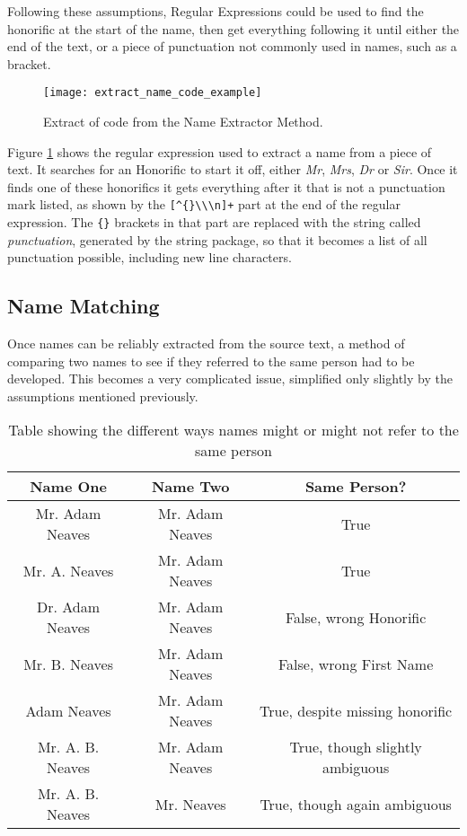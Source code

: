 Following these assumptions, Regular Expressions could be used to find the honorific at the start of the name, then get everything following it until either the end of the text, or a piece of punctuation not commonly used in names, such as a bracket.
\begin{figure}[ht]
\texttt{[image: extract\_name\_code\_example]}
\caption{Extract of code from the Name Extractor Method.}
\label{fig:name_extract_code}
\end{figure}

Figure \ref{fig:name_extract_code} shows the regular expression used to extract a name from a piece of text. It searches for an Honorific to start it off, either \emph{Mr}, \emph{Mrs}, \emph{Dr} or \emph{Sir}. Once it finds one of these honorifics it gets everything after it that is not a punctuation mark listed, as shown by the \verb|[^{}\\\n]+| part at the end of the regular expression. The \verb|{}| brackets in that part are replaced with the string called \emph{punctuation}, generated by the string package, so that it becomes a list of all punctuation possible, including new line characters.  

\subsection{Name Matching}
\label{sec:imp_name_match}
Once names can be reliably extracted from the source text, a method of comparing two names to see if they referred to the same person had to be developed. This becomes a very complicated issue, simplified only slightly by the assumptions mentioned previously.

\begin{table}[ht!]
\centering
\begin{tabular}{|c c c|}
Name One & Name Two & Same Person? \\
\hline
Mr. Adam Neaves  & Mr. Adam Neaves & True \\
Mr. A. Neaves    & Mr. Adam Neaves & True \\
Dr. Adam Neaves  & Mr. Adam Neaves & False, wrong Honorific \\
Mr. B. Neaves    & Mr. Adam Neaves & False, wrong First Name \\
Adam Neaves      & Mr. Adam Neaves & True, despite missing honorific \\
Mr. A. B. Neaves & Mr. Adam Neaves & True, though slightly ambiguous \\
Mr. A. B. Neaves & Mr. Neaves      & True, though again ambiguous    \\
\end{tabular}
\caption{Table showing the different ways names might or might not refer to the same person}
\label{tbl:name_match}
\end{table}

